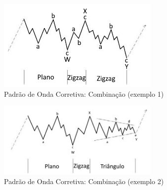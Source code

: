 \documentclass[12pt]{article}
\begin{document}
\begin{figure}[H]
	\centering
	\includegraphics[width=0.7\textwidth]{EW_pattern_11.png}
	\caption{Padrão de Onda Corretiva: Combinação (exemplo 1)}\label{fig:EW_pattern_11}
\end{figure}

\begin{figure}[H]
	\centering
	\includegraphics[width=0.7\textwidth]{EW_pattern_12.png}
	\caption{Padrão de Onda Corretiva: Combinação (exemplo 2)}\label{fig:EW_pattern_12}
\end{figure}
\end{document}
